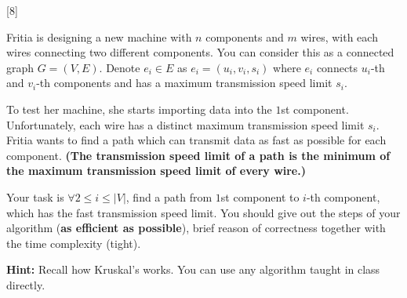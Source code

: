[8]

Fritia is designing a new machine with $n$ components and $m$ wires, with each wires connecting two different components. You can consider this as a connected graph $G=(V, E)$. 
Denote $e_i\in E$ as $e_i = (u_i,v_i,s_i)$ where $e_i$ connects $u_i$-th and $v_i$-th components and has a maximum transmission speed limit $s_i$.

To test her machine, she starts importing data into the $1$st component. Unfortunately, each wire has a distinct maximum transmission speed limit $s_i$. Fritia wants to find a path which can transmit data as fast as possible for each component. \textbf{(The transmission speed limit of a path is the minimum of the maximum transmission speed limit of every wire.)}

Your task is $\forall 2\leq i \leq |V|$, find a path from $1$st component to $i$-th component, which has the fast transmission speed limit. You should give out the steps of your algorithm (\textbf{as efficient as possible}), brief reason of correctness together with the time complexity (tight).

\textbf{Hint:} Recall how Kruskal's works. You can use any algorithm taught in class directly.

